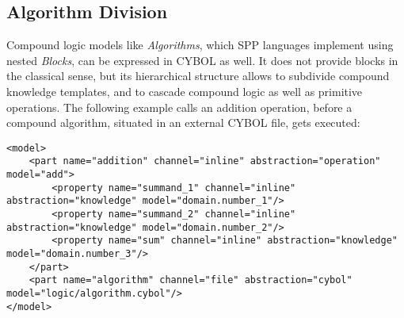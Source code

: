 %
%
%
%
%
%

\subsection{Algorithm Division}
\label{algorithm_division_heading}

Compound logic models like \emph{Algorithms}, which SPP languages implement
using nested \emph{Blocks}, can be expressed in CYBOL as well. It does not
provide blocks in the classical sense, but its hierarchical structure allows to
subdivide compound knowledge templates, and to cascade compound logic as well
as primitive operations. The following example calls an addition operation,
before a compound algorithm, situated in an external CYBOL file, gets executed:

\begin{scriptsize}
    \begin{verbatim}
<model>
    <part name="addition" channel="inline" abstraction="operation" model="add">
        <property name="summand_1" channel="inline" abstraction="knowledge" model="domain.number_1"/>
        <property name="summand_2" channel="inline" abstraction="knowledge" model="domain.number_2"/>
        <property name="sum" channel="inline" abstraction="knowledge" model="domain.number_3"/>
    </part>
    <part name="algorithm" channel="file" abstraction="cybol" model="logic/algorithm.cybol"/>
</model>
    \end{verbatim}
\end{scriptsize}
